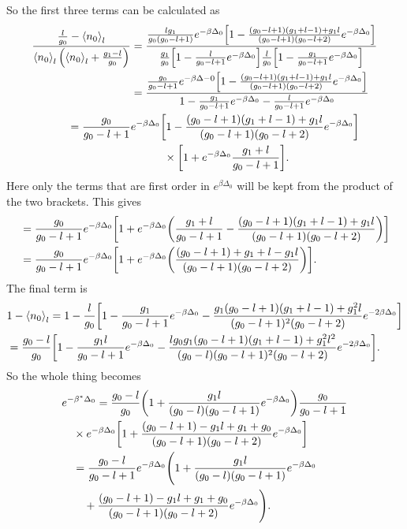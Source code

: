 So the first three terms can be calculated as 
\begin{align}
    \frac{\frac{l}{g_0}-\left<{n_0}\right>_l}{\left<{n_0}\right>_l\qty(\left<{n_0}\right>_l+\frac{g_1-l}{g_0})}&=\frac{\frac{lg_1}{g_0(g_0-l+1)}e^{-\beta\Delta_0}\qty[1-\frac{(g_0-l+1)(g_1+l-1)+g_1l}{(g_0-l+1)(g_0-l+2)}e^{-\beta\Delta_0}]}{\frac{g_1}{g_0}\qty[1-\frac{l}{g_0-l+1} e^{-\beta\Delta_0}]\frac{l}{g_0}\qty[1-\frac{g_1}{g_0-l+1} e^{-\beta\Delta_0}]}\nonumber\\
    &=\frac{\frac{g_0}{g_0-l+1}e^{-\beta\Delta-0}\qty[1-\frac{(g_0-l+1)(g_1+l-1)+g_1l}{(g_0-l+1)(g_0-l+2)}e^{-\beta\Delta_0}]}{1-\frac{g_1}{g_0-l+1}e^{-\beta\Delta_0}-\frac{l}{g_0-l+1}e^{-\beta\Delta_0}}\nonumber\\
    =\frac{g_0}{g_0-l+1}&e^{-\beta\Delta_0}\qty[1-\frac{(g_0-l+1)(g_1+l-1)+g_1l}{(g_0-l+1)(g_0-l+2)}e^{-\beta\Delta_0}]\nonumber\\
    &\quad\quad\quad\times\qty[1+e^{-\beta\Delta_0} \frac{g_1+l}{g_0-l+1}].
\end{align}
Here only the terms that are first order in $e^{\beta\Delta_0}$ will be kept from the product of the two brackets. This gives
\begin{align}
    &=\frac{g_0}{g_0-l+1}e^{-\beta\Delta_0}\qty[1+e^{-\beta\Delta_0}\qty(\frac{g_1+l}{g_0-l+1}-\frac{(g_0-l+1)(g_1+l-1)+g_1l}{(g_0-l+1)(g_0-l+2)})]\nonumber\\
    &=\frac{g_0}{g_0-l+1}e^{-\beta\Delta_0}\qty[1+e^{-\beta\Delta_0}\qty(\frac{(g_0-l+1)+g_1+l-g_1l}{(g_0-l+1)(g_0-l+2)})].
\end{align}
The final term is
\begin{align}
    &1-\left<{n_0}\right>_l=1-\frac{l}{g_0}\qty[1-\frac{g_1}{g_0-l+1}e^{-\beta\Delta_0}-\frac{g_1(g_0-l+1)(g_1+l-1)+g_1^2l}{(g_0-l+1)^2(g_0-l+2)}e^{-2\beta\Delta_0}]\nonumber\\
    &=\frac{g_0-l}{g_0}\qty[1-\frac{g_1l}{g_0-l+1}e^{-\beta\Delta_0}-\frac{lg_0g_1(g_0-l+1)(g_1+l-1)+g_1^2l^2}{(g_0-l)(g_0-l+1)^2(g_0-l+2)}e^{-2\beta\Delta_0}].
\end{align}
So the whole thing becomes 
\begin{align}
    &e^{-\beta^*\Delta_0}=\frac{g_0-l}{g_0}\qty(1+\frac{g_1l}{(g_0-l)(g_0-l+1)}e^{-\beta\Delta_0})\frac{g_0}{g_0-l+1}\nonumber\\
    &\quad\times e^{-\beta\Delta_0}\qty[1+\frac{(g_0-l+1)-g_1l+g_1+g_0}{(g_0-l+1)(g_0-l+2)}e^{-\beta\Delta_0}]\nonumber\\
    &\quad=\frac{g_0-l}{g_0-l+1}e^{-\beta\Delta_0}\Biggr(1+\frac{g_1l}{(g_0-l)(g_0-l+1)}e^{-\beta\Delta_0}\nonumber\\
    &\quad\quad +\frac{(g_0-l+1)-g_1l+g_1+g_0}{(g_0-l+1)(g_0-l+2)}e^{-\beta\Delta_0}\Biggr).
\end{align}